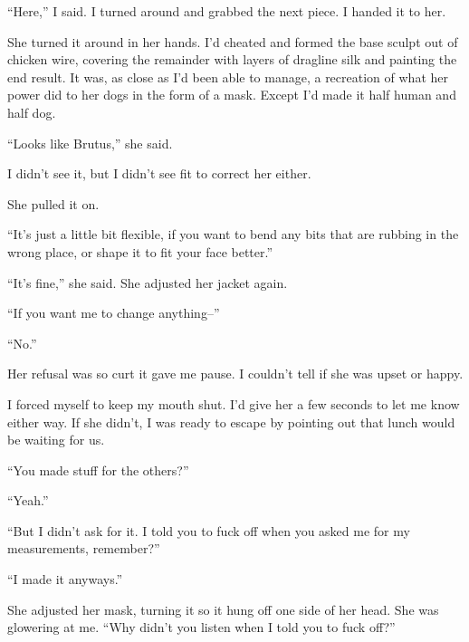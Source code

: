 ``Here,'' I said.  I turned around and grabbed the next piece.  I handed it to her.



She turned it around in her hands.  I'd cheated and formed the base sculpt out of chicken wire, covering the remainder with layers of dragline silk and painting the end result.  It was, as close as I'd been able to manage, a recreation of what her power did to her dogs in the form of a mask.  Except I'd made it half human and half dog.



``Looks like Brutus,'' she said.



I didn't see it, but I didn't see fit to correct her either.



She pulled it on.



``It's just a little bit flexible, if you want to bend any bits that are rubbing in the wrong place, or shape it to fit your face better.''



``It's fine,'' she said.  She adjusted her jacket again.



``If you want me to change anything--''



``No.''



Her refusal was so curt it gave me pause.  I couldn't tell if she was upset or happy.



I forced myself to keep my mouth shut.  I'd give her a few seconds to let me know either way.  If she didn't, I was ready to escape by pointing out that lunch would be waiting for us.



``You made stuff for the others?''



``Yeah.''



``But I didn't ask for it.  I told you to fuck off when you asked me for my measurements, remember?''



``I made it anyways.''



She adjusted her mask, turning it so it hung off one side of her head.  She was glowering at me.  ``Why didn't you listen when I told you to fuck off?''



